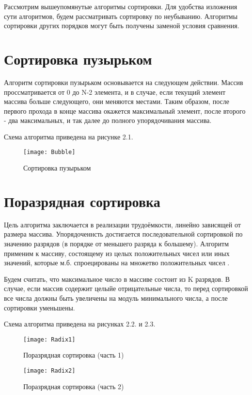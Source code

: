 Рассмотрим вышеупомянутые алгоритмы сортировки. Для удобства изложения сути алгоритмов, будем рассматривать сортировку по неубыванию. Алгоритмы сортировки других порядков могут быть получены заменой условия сравнения.

\section{Сортировка пузырьком}
Алгоритм сортировки пузырьком основывается на следующем действии. Массив проссматривается от 0 до N-2 элемента, и в случае, если текущий элемент массива больше следующего, они меняются местами. Таким образом, после первого прохода в конце массива окажется максимальный элемент, после второго - два максимальных, и так далее до полного упорядочивания массива.

Схема алгоритма приведена на рисунке 2.1.
\begin{figure}[h]
	\begin{center}
		{\texttt{[image: Bubble]}}
		\caption{Сортировка пузырьком}
	\end{center}
\end{figure}


\section{Поразрядная сортировка}
Цель алгоритма заключается в реализации трудоёмкости, линейно зависящей от размера массива. Упорядоченнсть достигается последовательной сортировкой по значению разрядов (в порядке от меньшего разряда к большему). Алгоритм применим к массиву, состоящему из целых положительных чисел или иных значений, которые м.б. спроецированы на множетво положительных чисел \cite{Korman}. 

Будем считать, что максимальное число в массиве состоит из K разрядов. В случае, если массив содержит целыйе отрицательные числа, то перед сортировкой все числа должны быть увеличены на модуль минимального числа, а после сортировки уменьшены.

Схема алгоритма приведена на рисунках 2.2. и 2.3.
\begin{figure}[h]
	\begin{center}
		{\texttt{[image: Radix1]}}
		\caption{Поразрядная сортировка (часть 1)}
	\end{center}
\end{figure}

\begin{figure}[h]
	\begin{center}
		{\texttt{[image: Radix2]}}
		\caption{Поразрядная сортировка (часть 2)}
	\end{center}
\end{figure}


